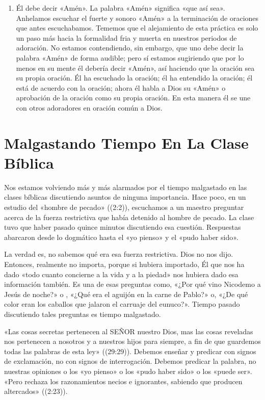 \documentclass[12pt, twoside, openright]{book}
\begin{document}
\begin{enumerate}
\item Él debe decir «Amén». La palabra «Amén» significa «que así sea». Anhelamos escuchar el fuerte y sonoro «Amén» a la terminación de oraciones que antes escuchabamos. Tememos que el alejamiento de esta práctica es solo un paso más hacia la formalidad fria y muerta en nuestros periodos de adoración. No estamos contendiendo, sin embargo, que uno debe decir la palabra «Amén» de forma audible; pero sí estamos sugiriendo que por lo menos en su mente él debería decir «Amén», así haciendo que la oración sea su propia oración. Él ha escuchado la oración; él ha entendido la oración; él está de acuerdo con la oración; ahora él habla a Dios su «Amén» o aprobación de la oración como su propia oración. En esta manera él se une con otros adoradores en oración común a Dios.
\end{enumerate}

\section{Malgastando Tiempo En La Clase Bíblica}
Nos estamos volviendo más y más alarmados por el tiempo malgastado en las clases bíblicas discutiendo asuntos de ninguna importancia. Hace poco, en un estudio del «hombre de pecado» ((2:2)), escuchamos a un maestro preguntar acerca de la fuerza restrictiva que había detenido al hombre de pecado. La clase tuvo que haber pasado quince minutos discutiendo esa cuestión. Respuestas abarcaron desde lo dogmático hasta el «yo pienso» y el «pudo haber sido».

La verdad es, no sabemos qué era esa fuerza restrictiva. Dios no nos dijo. Entonces, realmente no importa, porque si hubiera importado, Él que nos ha dado «todo cuanto concierne a la vida y a la piedad» nos hubiera dado esa información también. Es una de esas preguntas como, «¿Por qué vino Nicodemo a Jesús de noche?» o , «¿Qué era el aguijón en la carne de Pablo?» o, «¿De qué color eran los caballos que jalaron el carruaje del eunuco?». Tiempo pasado discutiendo tales preguntas es tiempo malgastado. 

«Las cosas secretas pertenecen al SEÑOR nuestro Dios, mas las cosas reveladas nos pertenecen a nosotros y a nuestros hijos para siempre, a fin de que guardemos todas las palabras de esta ley» ((29:29)).
Debemos enseñar y predicar con signos de exclamación, no con signos de interrogación. Debemos predicar la palabra, no nuestras opiniones o los «yo pienso» o los «pudo haber sido» o los «puede ser». «Pero rechaza los razonamientos necios e ignorantes, sabiendo que producen altercados» ((2:23)). 
\end{document}
